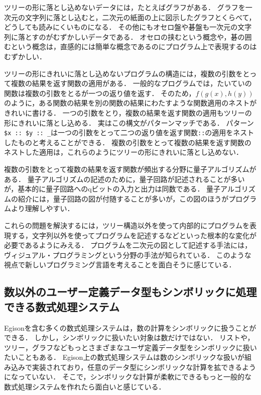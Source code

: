 ツリーの形に落とし込めないデータには，たとえばグラフがある．
グラフを一次元の文字列に落とし込むと，二次元の紙面の上に図示したグラフとくらべて，どうしても読みにくいものになる．
その他にもオセロ盤や碁盤も一次元の文字列に落とすのがむずかしいデータである．
オセロの挟むという概念や，碁の囲むという概念は，直感的には簡単な概念であるのにプログラム上で表現するのはむずかしい．

ツリーの形にきれいに落とし込めないプログラムの構造には，複数の引数をとって複数の結果を返す関数の適用がある．
一般的なプログラムでは，たいていの関数は複数の引数をとるが一つの返り値を返す．
そのため，$f(g(x),h(y))$のように，ある関数の結果を別の関数の結果にわたすような関数適用のネストがきれいに書ける．
一つの引数をとり，複数の結果を返す関数の適用もツリーの形にきれいに落とし込める．
実はこの構文がパターンマッチである．
パターン\lstinline{$x :: $y :: _}は一つの引数をとって二つの返り値を返す関数\lstinline{::}の適用をネストしたものと考えることができる．
複数の引数をとって複数の結果を返す関数のネストした適用は，これらのようにツリーの形にきれいに落とし込めない．

複数の引数をとって複数の結果を返す関数が頻出する分野に量子アルゴリズムがある．
量子アルゴリズムの記述のために，量子回路が記述されることが多いが，基本的に量子回路へのqビットの入力と出力は同数である．
量子アルゴリズムの紹介には，量子回路の図が付随することが多いが，この図のほうがプログラムより理解しやすい．

これらの問題を解決するには，ツリー構造以外を使って内部的にプログラムを表現する，文字列以外を使ってプログラムを記述するなどといった根本的な変化が必要であるようにみえる．
プログラムを二次元の図として記述する手法には，ヴィジュアル・プログラミングという分野の手法が知られている．
このような視点で新しいプログラミング言語を考えることを面白そうに感じている．

\subsection{数以外のユーザー定義データ型もシンボリックに処理できる数式処理システム}

Egisonを含む多くの数式処理システムは，数の計算をシンボリックに扱うことができる．
しかし，シンボリックに扱いたい対象は数だけではない．
リストや，ツリー，グラフなどもっとさまざまなユーザ定義データ型をシンボリックに扱いたいこともある．
Egison上の数式処理システムは数のシンボリックな扱いが組み込みで実装されており，任意のデータ型にシンボリックな計算を拡できるようになっていない．
そこで，シンボリックな計算が柔軟にできるもっと一般的な数式処理システムを作れたら面白いと感じている．

